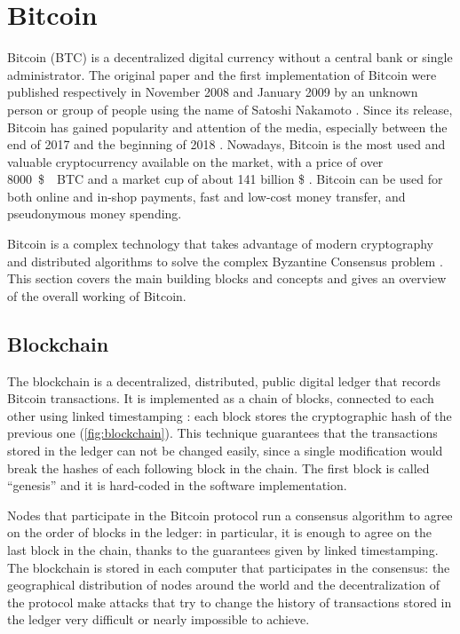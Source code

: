 \chapter{Bitcoin}
\label{chapter:bitcoin}
Bitcoin (BTC) is a decentralized digital currency without a central bank or single administrator.
The original paper \cite{bitcoin_2008} and the first implementation of Bitcoin were published respectively in November \num{2008} and January \num{2009} by an unknown person or group of people using the name of Satoshi Nakamoto \cite{bitcoin_website}.
Since its release, Bitcoin has gained popularity and attention of the media, especially between the end of \num{2017} and the beginning of \num{2018} \cite{bbc_2018, telegraph_2018, ilsole24ore_2018}.
Nowadays, Bitcoin is the most used and valuable cryptocurrency available on the market, with a price of over \SI{8000}{\$ \per BTC} and a market cup of about \num{141} billion \$ \cite{bitcoin_usage_study_2017, stats_coinmarketcap, stats_coinranking, stats_cryptocompare, stats_coincheckup, stats_moonstats}.
Bitcoin can be used for both online and in-shop payments, fast and low-cost money transfer, and pseudonymous money spending.

\bigskip
Bitcoin is a complex technology that takes advantage of modern cryptography and distributed algorithms to solve the complex Byzantine Consensus problem \cite{byzantin_generals_1982}.
This section covers the main building blocks and concepts and gives an overview of the overall working of Bitcoin.

\section{Blockchain}
The blockchain is a decentralized, distributed, public digital ledger that records Bitcoin transactions.
It is implemented as a chain of blocks, connected to each other using linked timestamping \cite{bitcoin_book_narayanan_2016, hash_function_wikipedia}:
each block stores the cryptographic hash of the previous one (\cref{fig:blockchain}).
This technique guarantees that the transactions stored in the ledger can not be changed easily, since a single modification would break the hashes of each following block in the chain.
The first block is called ``genesis'' and it is hard-coded in the software implementation.

Nodes that participate in the Bitcoin protocol run a consensus algorithm to agree on the order of blocks in the ledger:
in particular, it is enough to agree on the last block in the chain, thanks to the guarantees given by linked timestamping.
The blockchain is stored in each computer that participates in the consensus:
the geographical distribution of nodes around the world and the decentralization of the protocol make attacks that try to change the history of transactions stored in the ledger very difficult or nearly impossible to achieve.

